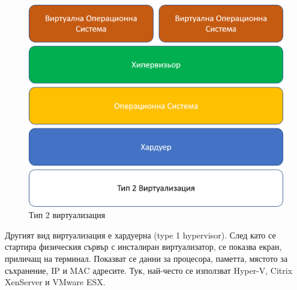 \begin{figure}[h]
	\centering
	\includegraphics[width=0.8\linewidth]{images/hypervisor2.png} %
	\caption{Тип 2 виртуализация}
	\label{fig:Тип 2 виртуализация}
\end{figure}

Другият вид виртуализация е хардуерна (type 1 hypervisor). След като се стартира физическия сървър с инсталиран виртуализатор, се показва екран, приличащ на терминал. Показват се данни за процесора, паметта, мястото за съхранение, IP и MAC адресите. Тук, най-често се използват Hyper-V, Citrix XenServer и VMware ESX.

